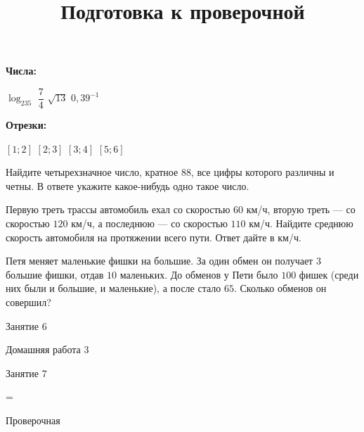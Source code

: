 \begin{class}[number=5]
\begin{listofex}
		\begin{minipage}[t]{0.58\linewidth}
			\textbf{Числа:}
			\begin{tasks}
				\task \( \log_235 \)
				\task \( \dfrac{ 7 }{4  } \)
				\task \( \sqrt{13} \)
				\task \( 0,39^{-1} \)
			\end{tasks}
		\end{minipage}
		\hspace{0.05\linewidth}
		\begin{minipage}[t]{\textwidth}
			\textbf{Отрезки:}
			\begin{tasks}
				\task \( [1;2] \)
				\task \( [2;3] \)
				\task \( [3;4] \)
				\task \( [5;6] \)
			\end{tasks}
		\end{minipage}
		\item Найдите четырехзначное число, кратное \(88\), все цифры которого различны и четны. В ответе укажите какое-нибудь одно такое число.
		\item Первую треть трассы автомобиль ехал со скоростью \(60\) км/ч, вторую треть --- со скоростью \(120\) км/ч, а последнюю --- со скоростью \(110\) км/ч. Найдите среднюю скорость автомобиля на протяжении всего пути. Ответ дайте в км/ч.
		\item Петя меняет маленькие фишки на большие. За один обмен он получает \(3\) большие фишки, отдав \(10\) маленьких. До обменов у Пети было \(100\) фишек (среди них были и большие, и маленькие), а после стало \(65\). Сколько обменов он совершил?
	\end{listofex}
\end{class}

\begin{class}[number=6]
	\begin{listofex}
		\item Занятие 6
	\end{listofex}
\end{class}

\begin{homework}[number=3]
	\begin{listofex}
		\item Домашняя работа 3
	\end{listofex}
\end{homework}

\begin{class}[number=7]
	\title{Подготовка к проверочной}
	\begin{listofex}
		\item Занятие 7
	\end{listofex}
\end{class}

=%
\begin{exam}
	\begin{listofex}
		\item Проверочная
	\end{listofex}
\end{exam}
